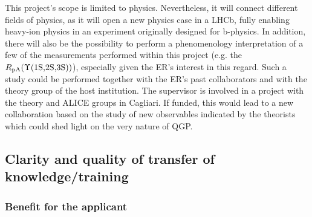 \documentclass[a4paper,11pt]{article}
\newcommand{\ER}{ER\xspace}
\newcommand{\Supervisor}{The supervisor\xspace}
\begin{document}
This project's scope is limited to physics. Nevertheless, it will connect different fields of physics, as it will open a new physics case in a LHCb, fully enabling heavy-ion physics in an experiment originally designed for b-physics.
In addition, there will also be the possibility to perform a phenomenology interpretation of a few of the measurements performed within this project (e.g. the $R_{\text{pA}}(\Upsilon\text{(1S,2S,3S)})$), especially given the \ER's interest in this regard. Such a study could be performed together with the \ER's past collaborators and with the theory group of the host institution. \Supervisor is involved in a project with the theory and ALICE  groups in Cagliari. If funded, this would lead to a new collaboration based on the study of new observables indicated by the theorists which could shed light on the very nature of QGP.

%       

\subsection{Clarity and quality of transfer of knowledge/training}



\subsubsection{Benefit for the applicant}
\label{sec:benefitapplicant}
\end{document}
